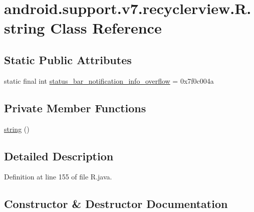 \hypertarget{classandroid_1_1support_1_1v7_1_1recyclerview_1_1_r_1_1string}{}\section{android.\+support.\+v7.\+recyclerview.\+R.\+string Class Reference}
\label{classandroid_1_1support_1_1v7_1_1recyclerview_1_1_r_1_1string}
\subsection*{Static Public Attributes}
\begin{DoxyCompactItemize}
\item 
static final int \mbox{\hyperlink{classandroid_1_1support_1_1v7_1_1recyclerview_1_1_r_1_1string_a1ea81bbbfacad9218b17fd12e0b9b258}{status\+\_\+bar\+\_\+notification\+\_\+info\+\_\+overflow}} = 0x7f0c004a
\end{DoxyCompactItemize}
\subsection*{Private Member Functions}
\begin{DoxyCompactItemize}
\item 
\mbox{\hyperlink{classandroid_1_1support_1_1v7_1_1recyclerview_1_1_r_1_1string_a8aea0a179ccf8abc4e8cfc80e3235be3}{string}} ()
\end{DoxyCompactItemize}


\subsection{Detailed Description}


Definition at line 155 of file R.\+java.



\subsection{Constructor \& Destructor Documentation}
\mbox{\label{classandroid_1_1support_1_1v7_1_1recyclerview_1_1_r_1_1string_a8aea0a179ccf8abc4e8cfc80e3235be3}} 
